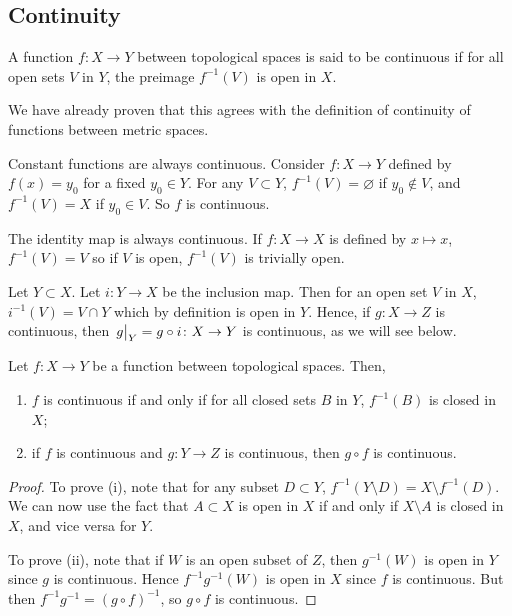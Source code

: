 \subsection{Continuity}
\begin{definition}
	A function \( f \colon X \to Y \) between topological spaces is said to be continuous if for all open sets \( V \) in \( Y \), the preimage \( f^{-1}(V) \) is open in \( X \).
\end{definition}
\begin{remark}
	We have already proven that this agrees with the definition of continuity of functions between metric spaces.
\end{remark}
\begin{example}
	Constant functions are always continuous.
	Consider \( f \colon X \to Y \) defined by \( f(x) = y_0 \) for a fixed \( y_0 \in Y \).
	For any \( V \subset Y \), \( f^{-1}(V) = \varnothing \) if \( y_0 \not\in V \), and \( f^{-1}(V) = X \) if \( y_0 \in V \).
	So \( f \) is continuous.
\end{example}
\begin{example}
	The identity map is always continuous.
	If \( f \colon X \to X \) is defined by \( x \mapsto x \), \( f^{-1}(V) = V \) so if \( V \) is open, \( f^{-1}(V) \) is trivially open.
\end{example}
\begin{example}
	Let \( Y \subset X \).
	Let \( i \colon Y \to X \) be the inclusion map.
	Then for an open set \( V \) in \( X \), \( i^{-1}(V) = V \cap Y \) which by definition is open in \( Y \).
	Hence, if \( g \colon X \to Z \) is continuous, then \( \eval{g}_Y = g \circ i \colon X \to Y \) is continuous, as we will see below.
\end{example}
\begin{proposition}
	Let \( f \colon X \to Y \) be a function between topological spaces.
	Then,
	\begin{enumerate}
		\item \( f \) is continuous if and only if for all closed sets \( B \) in \( Y \), \( f^{-1}(B) \) is closed in \( X \);
		\item if \( f \) is continuous and \( g \colon Y \to Z \) is continuous, then \( g \circ f \) is continuous.
	\end{enumerate}
\end{proposition}
\begin{proof}
	To prove (i), note that for any subset \( D \subset Y \), \( f^{-1}(Y \setminus D) = X \setminus f^{-1}(D) \).
	We can now use the fact that \( A \subset X \) is open in \( X \) if and only if \( X \setminus A \) is closed in \( X \), and vice versa for \( Y \).

	To prove (ii), note that if \( W \) is an open subset of \( Z \), then \( g^{-1}(W) \) is open in \( Y \) since \( g \) is continuous.
	Hence \( f^{-1}g^{-1}(W) \) is open in \( X \) since \( f \) is continuous.
	But then \( f^{-1}g^{-1} = (g \circ f)^{-1} \), so \( g \circ f \) is continuous.
\end{proof}
